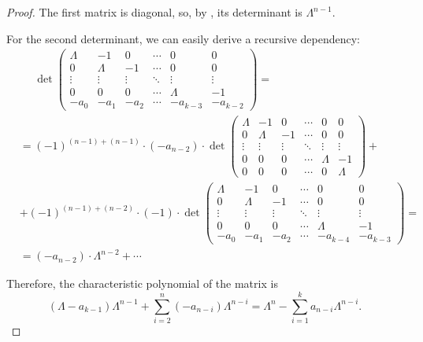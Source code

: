 \begin{proof}
  The first matrix is diagonal, so, by , its determinant is \( \Lambda^{n-1} \).

  For the second determinant, we can easily derive a recursive dependency:
  \begin{align*}
    &\phantom{{}={}}
    \det \begin{pmatrix}
      \Lambda & -1      & 0       & \cdots & 0        & 0      \\
      0       & \Lambda & -1      & \cdots & 0        & 0      \\
      \vdots  & \vdots  & \vdots  & \ddots & \vdots   & \vdots \\
      0       & 0       & 0       & \cdots & \Lambda  & -1     \\
      -a_0    & -a_1    & -a_2    & \cdots & -a_{k-3} & -a_{k-2}
    \end{pmatrix}
    = \\ &=
    (-1)^{(n-1)+(n-1)} \cdot (-a_{n-2}) \cdot
    \det \begin{pmatrix}
      \Lambda & -1      & 0       & \cdots & 0       & 0      \\
      0       & \Lambda & -1      & \cdots & 0       & 0      \\
      \vdots  & \vdots  & \vdots  & \ddots & \vdots  & \vdots \\
      0       & 0       & 0       & \cdots & \Lambda & -1     \\
      0       & 0       & 0       & \cdots & 0       & \Lambda
    \end{pmatrix}
    + \\ &+
    (-1)^{(n-1)+(n-2)} \cdot (-1) \cdot
    \det \begin{pmatrix}
      \Lambda & -1      & 0       & \cdots & 0        & 0      \\
      0       & \Lambda & -1      & \cdots & 0        & 0      \\
      \vdots  & \vdots  & \vdots  & \ddots & \vdots   & \vdots \\
      0       & 0       & 0       & \cdots & \Lambda  & -1     \\
      -a_0    & -a_1    & -a_2    & \cdots & -a_{k-4} & -a_{k-3}
    \end{pmatrix}
    = \\ &=
    (-a_{n-2}) \cdot \Lambda^{n-2} + \cdots
  \end{align*}

  Therefore, the characteristic polynomial of the matrix is
  \begin{equation*}
    (\Lambda - a_{k-1}) \Lambda^{n-1} + \sum_{i=2}^n (-a_{n-i}) \Lambda^{n-i}
    =
    \Lambda^n - \sum_{i=1}^k a_{n-i} \Lambda^{n-i}.
  \end{equation*}
\end{proof}

